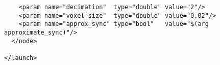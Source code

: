 \begin{center}
\begin{footnotesize}
\begin{verbatim}
    <param name="decimation"  type="double" value="2"/>
    <param name="voxel_size"  type="double" value="0.02"/>
    <param name="approx_sync" type="bool"   value="$(arg approximate_sync)"/>
  </node>

</launch>

\end{verbatim}
\end{footnotesize}
\end{center}